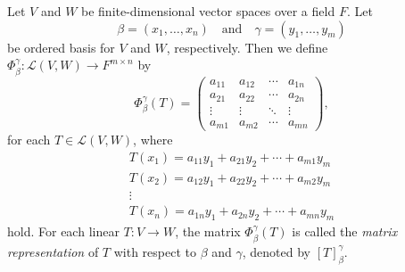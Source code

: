 \begin{definition}
  \label{def:matrix-representation}
  Let $V$ and $W$ be finite-dimensional vector spaces over a field $F$.
  Let
  \begin{equation*}
    \beta = (x_1, \dots, x_n)
    \quad \text{and} \quad
    \gamma = (y_1, \dots, y_m)
  \end{equation*}
  be ordered basis for $V$ and $W$, respectively.
  Then we define $\Phi_\beta^\gamma: \mathcal{L}(V, W) \to F^{m \times n}$
  by
  \begin{equation*}
    \Phi_\beta^\gamma(T) =
    \begin{pmatrix}
      a_{11} & a_{12} & \cdots & a_{1n} \\
      a_{21} & a_{22} & \cdots & a_{2n} \\
      \vdots & \vdots & \ddots & \vdots \\
      a_{m1} & a_{m2} & \cdots & a_{mn}
    \end{pmatrix},
  \end{equation*}
  for each $T \in \mathcal{L}(V, W)$, where
  \begin{equation*}
    \begin{gathered}
      T(x_1) = a_{11}y_1 + a_{21}y_2 + \cdots + a_{m1}y_m \\
      T(x_2) = a_{12}y_1 + a_{22}y_2 + \cdots + a_{m2}y_m \\
      \vdots \\
      T(x_n) = a_{1n}y_1 + a_{2n}y_2 + \cdots + a_{mn}y_m
    \end{gathered}
  \end{equation*}
  hold.
  For each linear $T: V \to W$, the matrix $\Phi_\beta^\gamma(T)$ is called the
  \emph{matrix representation} of $T$ with respect to $\beta$ and $\gamma$,
  denoted by $[T]_\beta^\gamma$.
\end{definition}

